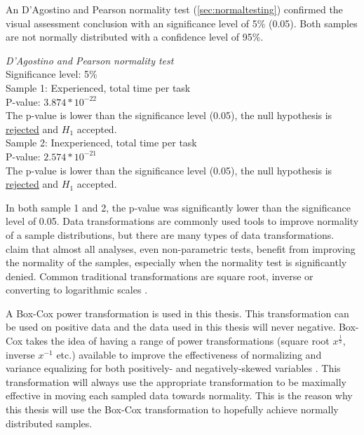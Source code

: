 An D'Agostino and Pearson normality test (\ref{sec:normaltesting}) confirmed the visual assessment conclusion with an significance level of 5\% (0.05). Both samples are not normally distributed with a confidence level of 95\%. \\[0.5cm]

\begin{center}
	\begin{tcolorbox}[box align=center,width=\textwidth-5cm]
			\centering
				\textit{D'Agostino and Pearson normality test}\\
				Significance level: 5\%  \\[0.5cm]
	
				Sample 1: Experienced, total time per task\\
				P-value: $3.874 * 10^{-22}$\\
				The p-value is lower than the significance level (0.05), the null hypothesis is \underline{rejected} and $H_1$ accepted.\\[0.5cm]
				
				Sample 2: Inexperienced, total time per task \\
				P-value: $2.574 * 10^{-21}$ \\
				The p-value is lower than the significance level (0.05), the null hypothesis is \underline{rejected} and $H_1$ accepted.\\[0.5cm]
	\end{tcolorbox} 
\end{center}

In both sample 1 and 2, the p-value was significantly lower than the significance level of 0.05. Data transformations are commonly used tools to improve normality of a sample distributions, but there are many types of data transformations. \cite{Osborne2010} claim that almost all analyses, even non-parametric tests, benefit from improving the normality of the samples, especially when the normality test is significantly denied. Common traditional transformations are square root, inverse or converting to logarithmic scales  \citep{Osborne2010}. 

A Box-Cox power transformation is used in this thesis. This transformation can be used on positive data and the data used in this thesis will never negative. Box-Cox takes the idea of having a range of power transformations (square root $x^{\frac{1}{2}}$, inverse $x^{-1}$ etc.) available to improve the effectiveness of normalizing and variance equalizing for both positively- and negatively-skewed variables \citep{Osborne2010}. This transformation will always use the appropriate transformation to be maximally effective in moving each sampled data towards normality. This is the reason why this thesis will use the Box-Cox transformation to hopefully achieve normally distributed samples.

